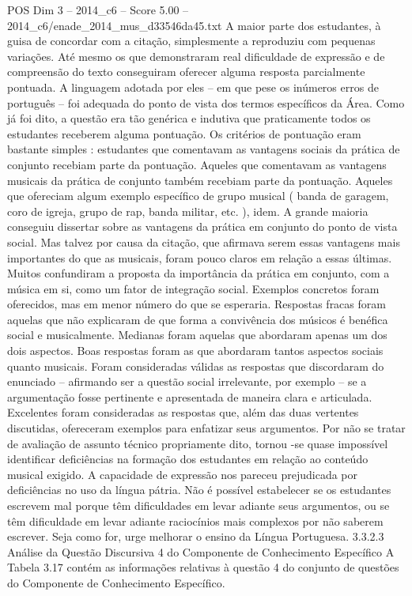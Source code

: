 \begin{textsample}{POS Dim 3 – 2014\_c6 – Score 5.00 – 2014\_c6/enade\_2014\_mus\_d33546da45.txt}
A maior parte dos estudantes, à guisa de concordar com a citação, simplesmente a reproduziu com pequenas variações.
Até mesmo os que demonstraram real dificuldade de expressão e de compreensão do texto conseguiram oferecer alguma resposta parcialmente pontuada.
A linguagem adotada por eles – em que pese os inúmeros erros de português – foi adequada do ponto de vista dos termos específicos da Área.
Como já foi dito, a questão era tão genérica e indutiva que praticamente todos os estudantes receberem alguma pontuação.
Os critérios de pontuação eram bastante simples : estudantes que comentavam as vantagens sociais da prática de conjunto recebiam parte da pontuação.
Aqueles que comentavam as vantagens musicais da prática de conjunto também recebiam parte da pontuação.
Aqueles que ofereciam algum exemplo específico de grupo musical ( banda de garagem, coro de igreja, grupo de rap, banda militar, etc. ), idem.
A grande maioria conseguiu dissertar sobre as vantagens da prática em conjunto do ponto de vista social.
Mas talvez por causa da citação, que afirmava serem essas vantagens mais importantes do que as musicais, foram pouco claros em relação a essas últimas.
Muitos confundiram a proposta da importância da prática em conjunto, com a música em si, como um fator de integração social.
Exemplos concretos foram oferecidos, mas em menor número do que se esperaria.
Respostas fracas foram aquelas que não explicaram de que forma a convivência dos músicos é benéfica social e musicalmente.
Medianas foram aquelas que abordaram apenas um dos dois aspectos.
Boas respostas foram as que abordaram tantos aspectos sociais quanto musicais.
Foram consideradas válidas as respostas que discordaram do enunciado – afirmando ser a questão social irrelevante, por exemplo – se a argumentação fosse pertinente e apresentada de maneira clara e articulada.
Excelentes foram consideradas as respostas que, além das duas vertentes discutidas, ofereceram exemplos para enfatizar seus argumentos.
Por não se tratar de avaliação de assunto técnico propriamente dito, tornou -se quase impossível identificar deficiências na formação dos estudantes em relação ao conteúdo musical exigido.
A capacidade de expressão nos pareceu prejudicada por deficiências no uso da língua pátria.
Não é possível estabelecer se os estudantes escrevem mal porque têm dificuldades em levar adiante seus argumentos, ou se têm dificuldade em levar adiante raciocínios mais complexos por não saberem escrever.
Seja como for, urge melhorar o ensino da Língua Portuguesa. 3.3.2.3 Análise da Questão Discursiva 4 do Componente de Conhecimento Específico A Tabela 3.17 contém as informações relativas à questão 4 do conjunto de questões do Componente de Conhecimento Específico.

\end{textsample}
